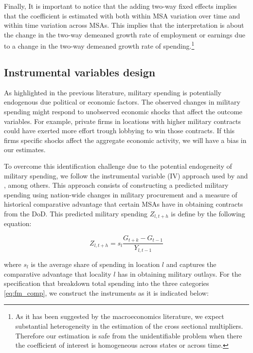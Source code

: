\documentclass[dv_diss_main.tex]{subfiles}
\begin{document}
Finally, It is important to notice that the adding two-way fixed effects implies that the coefficient is estimated with both within MSA variation over time and within time variation across MSAs\cite{}. This implies that the interpretation is about the change in the two-way demeaned growth rate of employment or earnings due to a change in the two-way demeaned growth rate of spending.\footnote{As it has been suggested by the macroeconomics literature, we expect substantial heterogeneity in the estimation of the cross sectional multipliers. Therefore our estimation is safe from the unidentifiable problem when there the coefficient of interest is homogeneous across states or across time.}

\subsection{Instrumental variables design}

As highlighted in the previous literature, military spending is potentially endogenous due political or economic factors. The observed changes in military spending might respond to unobserved economic shocks that affect the outcome variables. For example, private firms in locations with higher military contracts could have exerted more effort trough lobbying to win those contracts. If this firms specific shocks affect the aggregate economic activity, we will have a bias in our estimates. 

To overcome this identification challenge due to the potential endogeneity of military spending, we follow the instrumental variable (IV) approach used by \cite{Nakamura2014} and \cite{Auerbach2020}, among others. This approach consists of constructing a predicted military spending using nation-wide changes in military procurement and a measure of historical comparative advantage that certain MSAs have in obtaining contracts from the DoD. This predicted military spending $Z_{l,t+h}$ is define by the following equation:

\begin{equation}
    Z_{l,t+h} = s_{l} \frac{G_{t+k}-G_{t-1}}{Y_{l,t-1}}
    \label{eq:fm_iv}
\end{equation}

where $s_{l}$ is the average share of spending in location $l$ and captures the comparative advantage that locality $l$ has in obtaining military outlays. For the specification that breakdown total spending into the three categories \eqref{eq:fm_comp}, we construct the instruments as it is indicated below:
\end{document}
